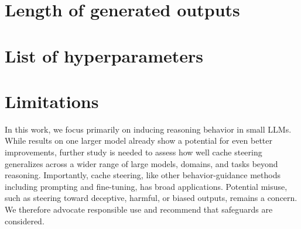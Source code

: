 \documentclass{article} %
\begin{document}
\newpage
\section{Length of generated outputs} \label{app:token_length}


\newpage
\section{List of hyperparameters} \label{hyperparams_list}



\section{Limitations} \label{limitations}

In this work, we focus primarily on inducing reasoning behavior in small LLMs. While results on one larger model already show a potential for even better improvements, further study is needed to assess how well cache steering generalizes across a wider range of large models, domains, and tasks beyond reasoning. Importantly, cache steering, like other behavior-guidance methods including prompting and fine-tuning, has broad applications. Potential misuse, such as steering toward deceptive, harmful, or biased outputs, remains a concern. We therefore advocate responsible use and recommend that safeguards are considered.
\end{document}
